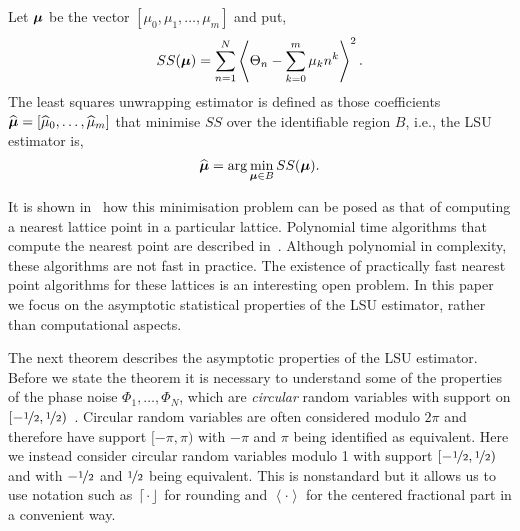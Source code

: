 \documentclass[aap,preprint]{imsart}
\newcommand{\fracpart}[1]{\left\langle #1 \right\rangle}
\newcommand{\round}[1]{{\left\lceil #1 \right\rfloor}}
\begin{document}
Let $\boldsymbol{\mu}$ be the vector $[\mu_0, \mu_1, \dots, \mu_m]$ and put,
\begin{equation} \label{eq:sumofsquaresfunction}
SS(\mubf) = \sum_{n=1}^{N}\fracpart{  \Theta_{n} - \sum_{k = 0}^{m}{\mu_k n^k} }^{2}.
\end{equation}
The least squares unwrapping estimator is defined as those coefficients $\widehat{\boldsymbol{\mu}} = [\widehat{\mu}_0, \dots, \widehat{\mu}_m]$ that minimise $SS$ over the identifiable region $B$, i.e., the LSU estimator is,
\begin{equation}\label{eq:hatmubfLSUdefn}
\widehat{\mubf} = \arg \min_{\mubf \in B} SS(\mubf). 
\end{equation}

It is shown in~\cite[Sec~8.1]{McKilliam2010thesis}\cite{McKilliam2009asilomar_polyest_lattice} how this minimisation problem can be posed as that of computing a nearest lattice point in a particular lattice. Polynomial time algorithms that compute the nearest point are described in~\cite[Sec.~4.3]{McKilliam2010thesis}.  Although polynomial in complexity, these algorithms are not fast in practice.  The existence of practically fast nearest point algorithms for these lattices is an interesting open problem.  In this paper we focus on the asymptotic statistical properties of the LSU estimator, rather than computational aspects.

The next theorem describes the asymptotic properties of the LSU estimator.  Before we state the theorem it is necessary to understand some of the properties of the phase noise $\Phi_1,\dots,\Phi_N$, which are \emph{circular} random variables with support on $[-\nicefrac{1}{2}, \nicefrac{1}{2})$~\cite{McKilliam2010thesis,McKilliam_mean_dir_est_sq_arc_length2010,Mardia_directional_statistics,Fisher1993}.  Circular random variables are often considered modulo $2\pi$ and therefore have support $[-\pi, \pi)$ with $-\pi$ and $\pi$ being identified as equivalent.  Here we instead consider circular random variables modulo 1 with support $[-\nicefrac{1}{2}, \nicefrac{1}{2})$ and with $-\nicefrac{1}{2}$ and $\nicefrac{1}{2}$ being equivalent.  This is nonstandard but it allows us to use notation such as $\round{\cdot}$ for rounding and $\fracpart{\cdot}$ for the centered fractional part in a convenient way.   %
\end{document}
